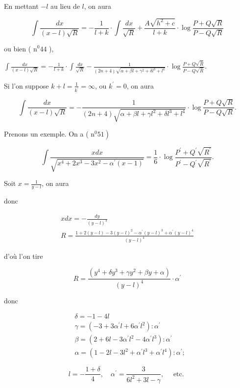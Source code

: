 \documentclass{article}
\begin{document}
En mettant \(-l\) au lieu de \(l\), on aura

\[
\int \frac{d x}{(x-l) \sqrt{R}}=-\frac{1}{l+k} \cdot \int \frac{d x}{\sqrt{R}}+\frac{A \sqrt{h^{2}+c}}{l+k} \cdot \log \frac{P+Q \sqrt{R}}{P-Q \sqrt{R}}
\]

ou bien ( \(\mathrm{n}^{0} 44\) ),

\(\int \frac{d x}{(x-l) \sqrt{R}}=-\frac{1}{l+k} \cdot \int \frac{d x}{\sqrt{R}}-\frac{1}{(2 n+4) \sqrt{\alpha+\beta l+\gamma^{2}+\delta l^{3}+l^{4}}} \cdot \log \frac{P+Q \sqrt{\bar{R}}}{P-Q \sqrt{\bar{R}}}\).

Si l'on suppose \(k+l=\frac{1}{k^{\prime}}=\infty\), ou \(k^{\prime}=0\), on aura

\[
\int \frac{d x}{(x-l) \sqrt{R}}=-\frac{1}{(2 n+4) \sqrt{\alpha+\beta l+\gamma l^{2}+\delta l^{3}+l^{4}}} \cdot \log \frac{P+Q \sqrt{R}}{P-Q \sqrt{R}} .
\]

Prenons un exemple. On a ( \(\left.\mathrm{n}^{0} 51\right)\)

\[
\int \frac{x d x}{\sqrt{x^{4}+2 x^{3}-3 x^{2}-\alpha^{\prime}(x-1)}}=\frac{1}{6} \cdot \log \frac{P^{\prime}+Q^{\prime} \sqrt{R^{\prime}}}{P^{\prime}-Q^{\prime} \sqrt{R^{\prime}}} .
\]

Soit \(x=\frac{1}{y-l}\), on aura

donc

\[
\begin{gathered}
x d x=-\frac{d y}{(y-l)^{3}} \\
R=\frac{1+2(y-l)-3(y-l)^{2}-\alpha^{\prime}(y-l)^{3}+\alpha^{\prime}(y-l)^{4}}{(y-l)^{4}}
\end{gathered}
\]

d'où l'on tire

\[
R=\frac{\left(y^{4}+\delta y^{3}+\gamma y^{2}+\beta y+\alpha\right)}{(y-l)^{4}} \cdot \alpha^{\prime}
\]

donc

\[
\begin{aligned}
& \delta=-1-4 l \\
& \gamma=\left(-3+3 \alpha^{\prime} l+6 \alpha^{\prime} l^{2}\right): \alpha^{\prime} \\
& \beta=\left(2+6 l-3 \alpha^{\prime} l^{2}-4 \alpha^{\prime} l^{3}\right): \alpha^{\prime} \\
& \alpha=\left(1-2 l-3 l^{2}+\alpha^{\prime} l^{3}+\alpha^{\prime} l^{4}\right): \alpha^{\prime} ;
\end{aligned}
\]

\[
l=-\frac{1+\delta}{4}, \quad \alpha^{\prime}=\frac{3}{6 l^{2}+3 l-\gamma}, \quad \text { etc. }
\]
\end{document}
